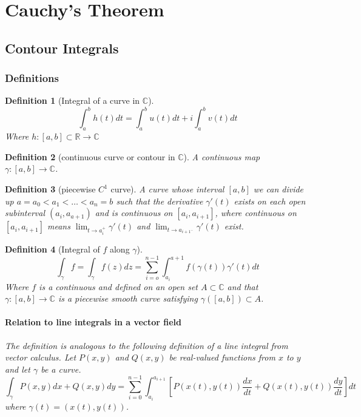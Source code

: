 \documentclass[a4paper]{article}
\newtheorem{definition}{Definition}
\newcommand{\C}{\mathbb{C}}
\newcommand{\R}{\mathbb{R}}
\begin{document}
\section{Cauchy's Theorem}

\subsection{Contour Integrals}

\subsubsection{Definitions}
\begin{definition}[Integral of a curve in $\C$]
  \[
    \int^b_a h(t) dt = \int^b_a u(t) dt + i \int^b_a v(t) dt
  \]
  Where \(h: [a, b] \subset \R \to \C \)


\end{definition}


\begin{definition}[continuous curve or contour in $\C$]
  A continuous map \(\gamma : [a, b] \to \C\).
\end{definition}

\begin{definition}[piecewise $C^1$ curve]
  A curve whose interval $[a, b]$ we can divide up $a = a_0 < a_1 <  \ldots < a_n = b$ such that the derivative $\gamma'(t)$ exists on each open subinterval $(a_i, a_{a + 1})$ and is continuous on $[a_i, a_{i + 1}]$, where continuous on $[a_i, a_{i + 1}]$ means $\lim_{t \to a_i^+} \gamma'(t)$ and $\lim_{t \to a_{i+1^-}} \gamma'(t)$ exist.
\end{definition}

\begin{definition}[Integral of $f$ along $\gamma$]
  \[
    \int_\gamma f = \int_\gamma f(z) dz = \sum^{n - 1}_{i = o} \int^{a+1}_{a_i} f(\gamma(t))\gamma'(t) dt
  \]
  Where $f$ is a continuous and defined on an open set $A \subset \C$ and that $\gamma: [a, b] \to \C$ is a piecewise smooth curve satisfying $\gamma([a, b]) \subset A$.\\

  \paragraph{Relation to line integrals in a vector field}
  The definition is analogous to the following definition of a line integral from vector calculus. Let $P(x, y)$ and $Q(x, y)$ be  real-valued functions from $x$ to $y$ and let $\gamma$ be a curve.
  \[
    \int_\gamma P(x, y) dx + Q(x, y) dy = \sum^{n- 1}_{i = 0} \int^{a_{i+1}}_{a_i} [P(x(t), y(t)) \frac{dx}{dt} + Q(x(t), y(t)) \frac{dy}{dt}] dt
  \]
  where $\gamma(t) = (x(t), y(t))$.
\end{definition}
\end{document}
